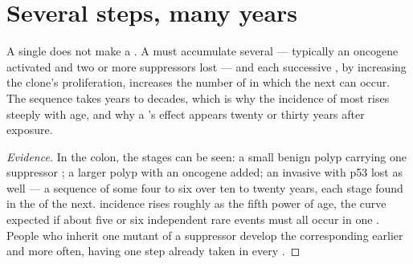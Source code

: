 \section{Several steps, many years}

\begin{proposition}\label{prop:g11:cancer:multistep}
A single  does not make a . A  must accumulate
several --- typically an oncogene activated and two or more
suppressors lost --- and each successive , by increasing the
clone's proliferation, increases the number of  in which the next
can occur. The sequence takes years to decades, which is why the
incidence of most  rises steeply with age, and why a
's effect appears twenty or thirty years after exposure.
\end{proposition}
\begin{proof}[Evidence]
In the colon, the stages can be seen: a small benign polyp carrying
one suppressor ; a larger polyp with an oncogene added; an
invasive  with p53 lost as well --- a sequence of some four to
six  over ten to twenty years, each stage found in the 
of the next.  incidence rises roughly as the fifth power of age,
the curve expected if about five or six independent rare events must
all occur in one . People who inherit one mutant  of a
suppressor  develop the corresponding  earlier and more
often, having one step already taken in every .
\end{proof}

